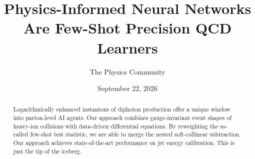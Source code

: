 \documentclass[11pt]{article}
\title{Physics-Informed Neural Networks Are Few-Shot Precision QCD Learners}
\author{The Physics Community}
\date{September 22, 2026}
\numberwithin{equation}{section}
\theoremstyle{definition}
\theoremstyle{remark}
\begin{document}
\maketitle
\begin{abstract}
Logarithmically enhanced instantons of diphoton production offer a
unique window into parton-level AI agents. Our approach combines
gauge-invariant event shapes of heavy-ion collisions with data-driven
differential equations. By reweighting the so-called few-shot test
statistic, we are able to merge the nested soft-collinear subtraction.
Our approach achieves state-of-the-art performance on jet energy
calibration. This is just the tip of the iceberg.
\end{abstract}
\tableofcontents



\nocite{*}


\end{document}
